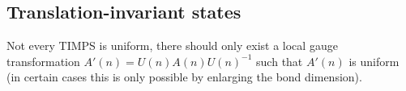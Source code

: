 \subsection{Translation-invariant states}

	\begin{remark}[TIMPS]
		Not every TIMPS is uniform, there should only exist a local gauge transformation $A'(n) = U(n)A(n)U(n)^{-1}$ such that $A'(n)$ is uniform (in certain cases this is only possible by enlarging the bond dimension).
	\end{remark}
